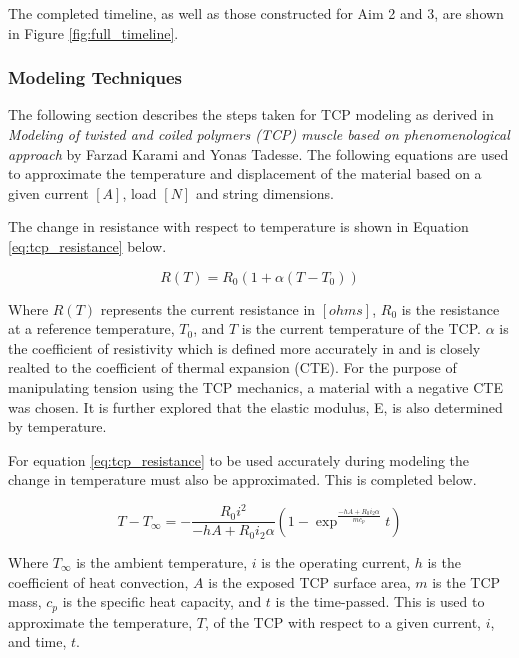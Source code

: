 		The completed timeline, as well as those constructed for Aim 2 and 3, are shown in Figure \ref{fig:full_timeline}.

	\subsubsection{Modeling Techniques}
	\label{sect:aim1_modeling_techniques}
	
		The following section describes the steps taken for TCP modeling as derived in \textit{Modeling of twisted and coiled polymers (TCP) muscle based on phenomenological approach} by Farzad Karami and Yonas Tadesse. The following equations are used to approximate the temperature and displacement of the material based on a given current $[A]$, load $[N]$ and string dimensions.

		The change in resistance with respect to temperature is shown in Equation \ref{eq:tcp_resistance} below.
	
		\begin{equation}
		\label{eq:tcp_resistance}
			R(T) = R_{0} (1 + \alpha (T - T_{0}))
		\end{equation}
	
		Where $R(T)$ represents the current resistance in $[ohms]$, $R_{0}$ is the resistance at a reference temperature, $T_{0}$, and $T$ is the current temperature of the TCP. $\alpha$ is the coefficient of resistivity which is defined more accurately in \cite{yang_top-down_2016} and is closely realted to the coefficient of thermal expansion (CTE). For the purpose of manipulating tension using the TCP mechanics, a material with a negative CTE was chosen. It is further explored that the elastic modulus, E, is also determined by temperature.
	
		For equation \ref{eq:tcp_resistance} to be used accurately during modeling the change in temperature must also be approximated. This is completed below.
	
		\begin{equation}
		\label{eq:tcp_temperature}
			T - T_{\infty} =
				- \frac{R_{0} i^{2}}{-h A + R_{0} i_{2} \alpha}
				\left(
					1 -
					\exp^{\frac{-h A + R_{0} i_{2} \alpha}{m c_{p}}} t
				\right)
		\end{equation}
	
		Where $T_{\infty}$ is the ambient temperature, $i$ is the operating current, $h$ is the coefficient of heat convection, $A$ is the exposed TCP surface area, $m$ is the TCP mass, $c_{p}$ is the specific heat capacity, and $t$ is the time-passed. This is used to approximate the temperature, $T$, of the TCP with respect to a given current, $i$, and time, $t$.
	

